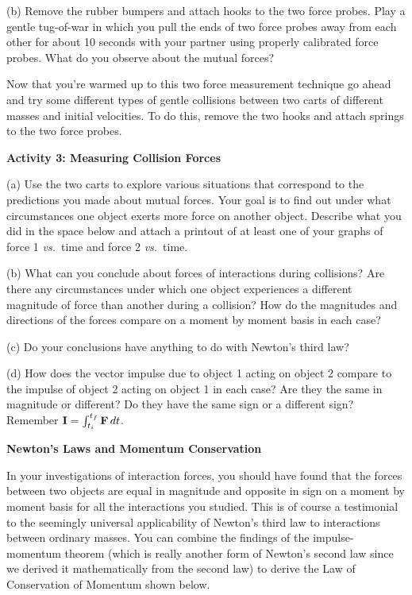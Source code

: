 (b) Remove the rubber bumpers and attach hooks to the two force probes. Play a gentle tug-of-war in which you pull the ends of two force probes
away from each other for about 10 seconds with your partner using properly calibrated force probes. What do you observe about the mutual forces?
\vspace{20mm}

Now that you're warmed up to this two force measurement technique go ahead and
try some different types of gentle collisions between two carts of different
masses and initial velocities. To do this, remove the two hooks and attach springs to the two force probes.

\newpage
\textbf{Activity 3: Measuring Collision Forces }

(a) Use the two carts to explore various situations that correspond to the predictions
you made about mutual forces. Your goal is to find out under what circumstances
one object exerts more force on another object. Describe what you did in the
space below and attach a printout of at least one of your graphs of force 1 \textit{vs.}~time and force 2 \textit{vs.}~time.
\vspace{30mm}

(b) What can you conclude about forces of interactions during collisions? Are there any circumstances under which one object experiences a different magnitude of force
than another during a collision? How do the magnitudes and directions of the
forces compare on a moment by moment basis in each case? 
\vspace{30mm}

(c) Do your conclusions have anything to do with Newton's third law?
\vspace{20mm}

(d) How does the vector impulse due to object 1 acting on object 2 compare to
the impulse of object 2 acting on object 1 in each case? Are they the same in
magnitude or different? Do they have the same sign or a different sign? Remember
\( {\bf I}=\int _{t_{i}}^{t_{f}}{\bf F}\,dt \).
\vspace{20mm}

\textbf{Newton's Laws and Momentum Conservation} 

In your investigations of interaction forces, you should have found that the
forces between two objects are equal in magnitude and opposite in sign on a
moment by moment basis for all the interactions you studied. This is of course
a testimonial to the seemingly universal applicability of Newton's third law
to interactions between ordinary masses. You can combine the findings of the
impulse-momentum theorem (which is really another form of Newton's second law
since we derived it mathematically from the second law) to derive the Law of
Conservation of Momentum shown below.

